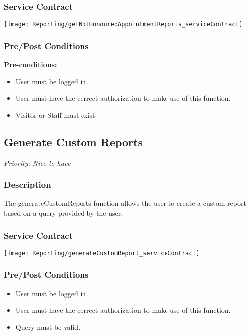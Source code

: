 \subsubsection{Service Contract}
\texttt{[image: Reporting/getNotHonouredAppointmentReports\_serviceContract]}
\subsubsection{Pre/Post Conditions}
	\textbf{Pre-conditions:}
	\begin{itemize}
		\item User must be logged in.
		\item User must have the correct authorization to make use of this function.
		\item Visitor or Staff must exist.
	\end{itemize}

\subsection{Generate Custom Reports}
\textit{Priority: Nice to have}

\subsubsection{Description}
The generateCustomReports function allows the user to create a custom report based on a query provided by the user.

\subsubsection{Service Contract}
\texttt{[image: Reporting/generateCustomReport\_serviceContract]}

\subsubsection{Pre/Post Conditions}
	\begin{itemize}
		\item User must be logged in.
		\item User must have the correct authorization to make use of this function.
		\item Query must be valid.
	\end{itemize}


